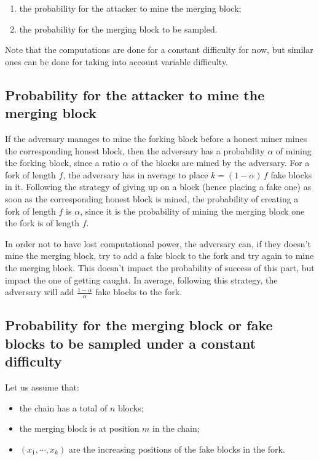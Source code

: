 \documentclass[11pt]{report}
\begin{document}
            \begin{enumerate}
            \item the probability for the attacker to mine the merging block;
            \item the probability for the merging block to be sampled.
            \end{enumerate}
            
            Note that the computations are done for a constant difficulty for now, but similar ones can be done for taking into account variable difficulty.
            
            \subsection{Probability for the attacker to mine the merging block}
                If the adversary manages to mine the forking block before a honest miner mines the corresponding honest block, then the adversary has a probability \(\alpha\) of mining the forking block, since a ratio \(\alpha\) of the blocks are mined by the adversary. For a fork of length \(f\), the adversary has in average to place \(k=(1-\alpha)\,f\) fake blocks in it. Following the strategy of giving up on a block (hence placing a fake one) as soon as the corresponding honest block is mined, the probability of creating a fork of length \(f\) is \(\alpha\), since it is the probability of mining the merging block one the fork is of length \(f\).
                
                In order not to have lost computational power, the adversary can, if they doesn't mine the merging block, try to add a fake block to the fork and try again to mine the merging block. This doesn't impact the probability of success of this part, but impact the one of getting caught. In average, following this strategy, the adversary will add \(\frac{1-\alpha}{\alpha}\) fake blocks to the fork.
            \subsection{Probability for the merging block or fake blocks to be sampled under a constant difficulty}
                Let us assume that:
                \begin{itemize}
                    \item the chain has a total of \(n\) blocks;
                    \item the merging block is at position \(m\) in the chain;
                    \item \((x_1,\cdots,x_k)\) are the increasing positions of the fake blocks in the fork.
                \end{itemize}
                
\end{document}
